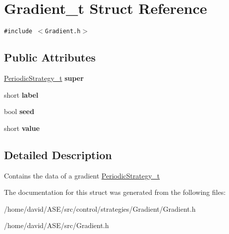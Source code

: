 \hypertarget{structGradient__t}{
\section{Gradient\_\-t Struct Reference}
\label{structGradient__t}
}
{\tt \#include $<$Gradient.h$>$}

\subsection*{Public Attributes}
\begin{CompactItemize}
\item 
\hypertarget{structGradient__t_56afa2a96c6aab698402985a0790ba77}{
\hyperlink{structPeriodicStrategy__t}{PeriodicStrategy\_\-t} \textbf{super}}
\label{structGradient__t_56afa2a96c6aab698402985a0790ba77}

\item 
\hypertarget{structGradient__t_4475bc475afcc25dd1206e29d916d8f8}{
short \textbf{label}}
\label{structGradient__t_4475bc475afcc25dd1206e29d916d8f8}

\item 
\hypertarget{structGradient__t_9b815c20de0daa2e7e696680bae36f4a}{
bool \textbf{seed}}
\label{structGradient__t_9b815c20de0daa2e7e696680bae36f4a}

\item 
\hypertarget{structGradient__t_13a5569d3f1a74a76b2b4471770171db}{
short \textbf{value}}
\label{structGradient__t_13a5569d3f1a74a76b2b4471770171db}

\end{CompactItemize}


\subsection{Detailed Description}
Contains the data of a gradient  \hyperlink{structPeriodicStrategy__t}{PeriodicStrategy\_\-t} 

The documentation for this struct was generated from the following files:\begin{CompactItemize}
\item 
/home/david/ASE/src/control/strategies/Gradient/Gradient.h\item 
/home/david/ASE/src/Gradient.h\end{CompactItemize}
